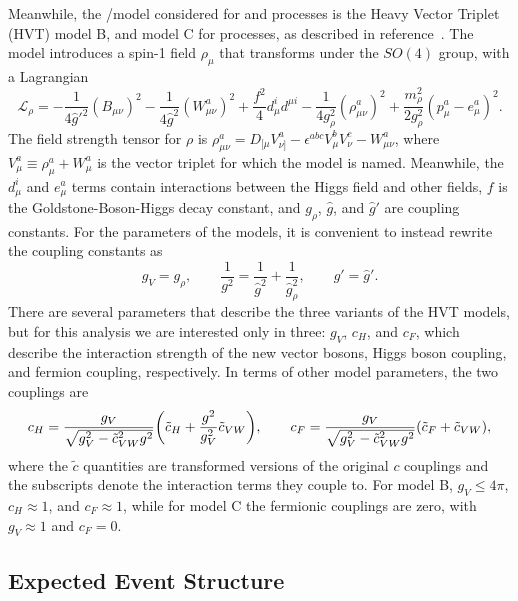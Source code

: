 Meanwhile, the \Wpr/\Zpr model considered for \ggF and \DY processes is the Heavy Vector Triplet (HVT) model B, and model C for \VBF processes, as described in reference~\cite{Pappadopulo_2014}.
The model introduces a spin-1 field $\rho_\mu$ that transforms under the $SO(4)$ group, with a Lagrangian
\begin{equation}
  \mathcal{L}_\rho=-\frac{1}{4\hat{g}'^2}(B_{\mu\nu})^2-\frac{1}{4\hat{g}^2}(W_{\mu\nu}^a)^2+\frac{f^2}{4}d_\mu^id^{\mu i}-\frac{1}{4g_\rho^2}(\rho_{\mu\nu}^a)^2+\frac{m_\rho^2}{2g_\rho^2}(p_\mu^a-e_\mu^a)^2.
\end{equation}
The field strength tensor for $\rho$ is $\rho_{\mu\nu}^a=D_{[\mu}V_{\nu]}^a-\epsilon^{abc}V_\mu^bV_\nu^c-W_{\mu\nu}^a$, where $V_\mu^a\equiv\rho_\mu^a+W_\mu^a$ is the vector triplet for which the model is named.
Meanwhile, the $d_\mu^i$ and $e_\mu^a$ terms contain interactions between the Higgs field and other fields, $f$ is the Goldstone-Boson-Higgs decay constant, and $g_\rho$, $\hat{g}$, and $\hat{g}'$ are coupling constants.
For the parameters of the models, it is convenient to instead rewrite the coupling constants as
\begin{equation}
  g_V=g_\rho,\qquad \frac{1}{g^2}=\frac{1}{\hat{g}^2}+\frac{1}{\hat{g}_\rho^2},\qquad g'=\hat{g}'.
\end{equation}
There are several parameters that describe the three variants of the HVT models, but for this analysis we are interested only in three: $g_V$, $c_H$, and $c_F$, which describe the interaction strength of the new vector bosons, Higgs boson coupling, and fermion coupling, respectively.
In terms of other model parameters, the two couplings are
\begin{equation}
  c_H=\frac{g_V}{\sqrt{g_V^2-\tilde{c}_{VW}^2g^2}}\pqty{\tilde{c}_H+\frac{g^2}{g_V^2}\tilde{c}_{VW}},\qquad c_F=\frac{g_V}{\sqrt{g_V^2-\tilde{c}_{VW}^2g^2}}(\tilde{c}_F+\tilde{c}_{VW}),
\end{equation}
where the $\tilde{c}$ quantities are transformed versions of the original $c$ couplings and the subscripts denote the interaction terms they couple to.
For model B, $g_V\leq4\pi$, $c_H\approx1$, and $c_F\approx1$, while for model C the fermionic couplings are zero, with $g_V\approx1$ and $c_F=0$.

\subsection{Expected Event Structure}
\label{subsec:expEvent}

